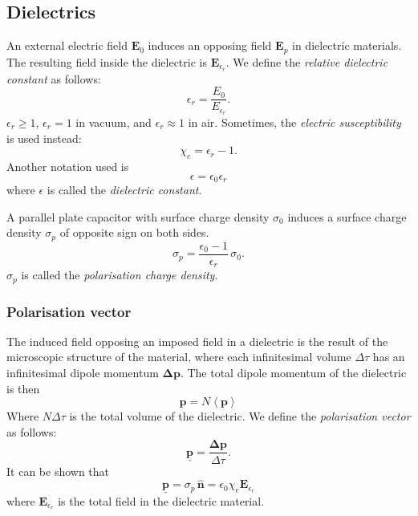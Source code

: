 \documentclass[a4paper, 12pt]{article}
\renewcommand{\vec}[1]{\bm{#1}}
\newcommand{\E}{\ensuremath{\vec{E}}}
\newcommand{\e}{\ensuremath{\epsilon_0}}
\newcommand{\p}{\ensuremath{\vec{\underline{p}}}}
\let\tmp\hat
\renewcommand{\hat}[1]{\vec{\tmp{#1}}}
\begin{document}
\subsection{Dielectrics}    
    An external electric field $\E_0$ induces an opposing field $\E_p$ in dielectric materials. 
    The resulting field inside the dielectric is $\E_{\epsilon_r}$. We define the \textit{relative dielectric constant} as follows: 
    \begin{equation}
        \epsilon_r = \frac{E_0}{E_{\epsilon_r}}.
    \end{equation}
    $\epsilon_r \geq 1$,  $\epsilon_r = 1$ in vacuum, and $\epsilon_r \approx 1$ in air.
    Sometimes, the \textit{electric susceptibility} is used instead:
    \begin{equation}
        \chi_e = \epsilon_r -1.
    \end{equation}
    Another notation used is 
    \begin{equation}
        \epsilon = \e\epsilon_r
    \end{equation}
    where $\epsilon$ is called the \textit{dielectric constant}.
    
    A parallel plate capacitor with surface charge density $\sigma_0$ induces a surface charge density $\sigma_p$ of opposite sign on both sides. 
    \begin{equation}
        \sigma_p = \frac{\e -1}{\epsilon_r}\,\sigma_0.
    \end{equation}
    $\sigma_p$ is called the \textit{polarisation charge density}.
    
    \subsubsection{Polarisation vector}
        The induced field opposing an imposed field in a dielectric is the result of the microscopic structure of the material, 
        where each infinitesimal volume $\Delta \tau$ has an infinitesimal dipole momentum $\vec{\Delta p}$. 
        The total dipole momentum of the dielectric is then 
        \begin{equation}
            \vec{p} = N\left< \vec{p} \right>
        \end{equation}
        Where $N\Delta \tau$ is the total volume of the dielectric. We define the \textit{polarisation vector} as follows:
        \begin{equation}
            \p = \frac{\vec{\Delta p}}{\Delta \tau}.
        \end{equation}
        It can be shown that 
        \begin{equation}
            \p = \sigma_p\,\hat{n} = \e \chi_e \E_{\epsilon_r}
        \end{equation}
        where $\E_{\epsilon_r}$ is the total field in the dielectric material.
        
\end{document}
